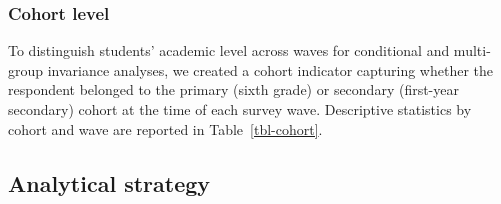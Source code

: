 \documentclass[
  13pt,
]{article}
\begin{document}
\subsubsection{Cohort level}\label{cohort-level}

To distinguish students' academic level across waves for conditional and
multi-group invariance analyses, we created a cohort indicator capturing
whether the respondent belonged to the primary (sixth grade) or
secondary (first-year secondary) cohort at the time of each survey wave.
Descriptive statistics by cohort and wave are reported in
Table~\ref{tbl-cohort}.

\begin{table}

\caption{\label{tbl-cohort}Descriptive statistics for cohort level}


\end{table}%

\subsection{Analytical strategy}\label{analytical-strategy}
\end{document}
